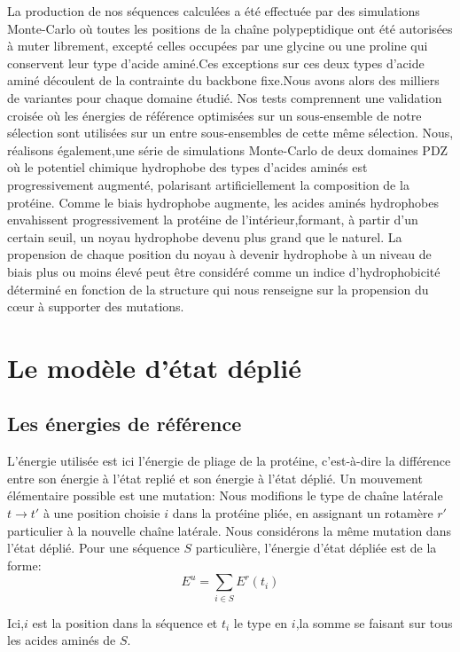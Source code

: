 La production de nos séquences calculées a été effectuée par des simulations Monte-Carlo où toutes les positions de la chaîne polypeptidique ont été autorisées à muter librement, excepté celles occupées par une glycine ou une proline qui conservent leur type d'acide aminé.Ces exceptions sur ces deux types d'acide aminé découlent de la contrainte du backbone fixe.Nous avons alors des milliers de variantes pour chaque domaine étudié. Nos tests comprennent une validation croisée où les énergies de référence optimisées sur un sous-ensemble de notre sélection sont utilisées sur un entre sous-ensembles de cette même sélection. Nous, réalisons également,une série de simulations Monte-Carlo de deux domaines PDZ où le potentiel chimique hydrophobe des types d'acides aminés est progressivement augmenté, polarisant artificiellement la composition de la protéine. Comme le biais hydrophobe augmente, les acides aminés hydrophobes envahissent progressivement la protéine de l'intérieur,formant, à partir d'un certain seuil, un noyau hydrophobe devenu plus grand que le naturel.
La propension de chaque position du noyau à devenir hydrophobe à un niveau de biais plus ou moins élevé peut être considéré comme un indice d'hydrophobicité déterminé en fonction de la structure qui nous renseigne sur la propension du cœur à supporter des mutations.

\section{Le modèle d'état déplié}
\subsection{Les énergies de référence}

L'énergie utilisée est ici l'énergie de pliage de la protéine, c'est-à-dire la différence entre
son énergie à l'état replié et son énergie à l'état déplié. Un mouvement élémentaire possible est une \og mutation\fg:
Nous modifions le type de chaîne latérale $t \rightarrow t'$ à une position choisie $i$ dans la protéine pliée, en assignant
un rotamère $r'$ particulier à la nouvelle chaîne latérale. Nous considérons la même mutation dans
l'état déplié. Pour une séquence $S$ particulière, l'énergie d'état dépliée est de la forme:
\begin{equation}
  E^u=\sum_{i\in S}E^r(t_i)
  \label{eq:unfolded}
\end{equation} 

Ici,$i$ est la position dans la séquence et $t_i$ le type en $i$,la somme se faisant sur tous les acides aminés de $S$.

